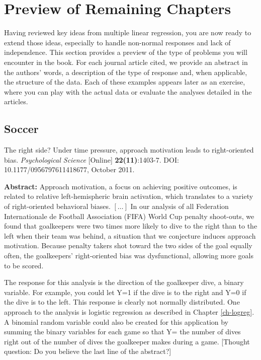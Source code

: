 \documentclass[
]{krantz}
\renewenvironment{quote}{\begin{VF}}{\end{VF}}
\begin{document}
\hypertarget{preview-of-remaining-chapters}{%
\section{Preview of Remaining Chapters}\label{preview-of-remaining-chapters}}

Having reviewed key ideas from multiple linear regression, you are now ready to extend those ideas, especially to handle non-normal responses and lack of independence. This section provides a preview of the type of problems you will encounter in the book. For each journal article cited, we provide an abstract in the authors' words, a description of the type of response and, when applicable, the structure of the data. Each of these examples appears later as an exercise, where you can play with the actual data or evaluate the analyses detailed in the articles.

\hypertarget{soccer}{%
\subsection{Soccer}\label{soccer}}

\citet{Roskes2011} The right side? Under time pressure, approach motivation leads to right-oriented bias. \emph{Psychological Science} {[}Online{]} \textbf{22(11)}:1403-7. DOI: 10.1177/0956797611418677, October 2011.

\begin{quote}
\textbf{Abstract:} Approach motivation, a focus on achieving positive outcomes, is related to relative left-hemispheric brain activation, which translates to a variety of right-oriented behavioral biases. \([\ldots]\) In our analysis of all Federation Internationale de Football Association (FIFA) World Cup penalty shoot-outs, we found that goalkeepers were two times more likely to dive to the right than to the left when their team was behind, a situation that we conjecture induces approach motivation. Because penalty takers shot toward the two sides of the goal equally often, the goalkeepers' right-oriented bias was dysfunctional, allowing more goals to be scored.
\end{quote}

The response for this analysis is the direction of the goalkeeper dive, a binary variable. For example, you could let Y=1 if the dive is to the right and Y=0 if the dive is to the left. This response is clearly not normally distributed. One approach to the analysis is logistic regression as described in Chapter \ref{ch-logreg}. A binomial random variable could also be created for this application by summing the binary variables for each game so that Y= the number of dives right out of the number of dives the goalkeeper makes during a game. {[}Thought question: Do you believe the last line of the abstract?{]}
\end{document}
